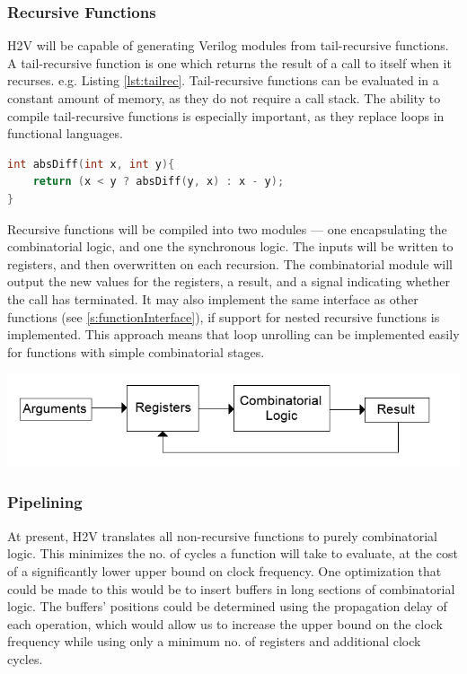\documentclass[english,onecolumn]{article}
\begin{document}
\subsubsection{Recursive Functions}
H2V will be capable of generating Verilog modules from tail-recursive functions. A tail-recursive function is one which returns the  result of a call to itself when it recurses. e.g. Listing \ref{lst:tailrec}. Tail-recursive functions can be evaluated in a constant amount of memory, as they do not require a call stack. The ability to compile tail-recursive functions is especially important, as they replace loops in functional languages.

\begin{lstlisting}[language=C, caption={An example of a tail-recursive function in C.}, label={lst:tailrec}]
int absDiff(int x, int y){
    return (x < y ? absDiff(y, x) : x - y);
}
\end{lstlisting}

Recursive functions will be compiled into two modules --- one encapsulating the combinatorial logic, and one the synchronous logic.
The inputs will be written to registers, and then overwritten on each recursion. The combinatorial module will output the new values for the registers, a result, and a signal indicating whether the call has terminated. It may also implement the same interface as other functions (see \ref{s:functionInterface}), if support for nested recursive functions is implemented.
This approach means that loop unrolling can be implemented easily for functions with simple combinatorial stages.

\includegraphics[scale=0.5]{./recursive.png}

\subsubsection{Pipelining}
At present, H2V translates all non-recursive functions to purely combinatorial logic. This minimizes the no. of cycles a function will take to evaluate, at the cost of a significantly lower upper bound on clock frequency. One optimization that could be made to this would be to insert buffers in long sections of combinatorial logic. The buffers' positions could be determined using the propagation delay of each operation, which would allow us to increase the upper bound on the clock frequency while using only a minimum no. of registers and additional clock cycles.
\end{document}
